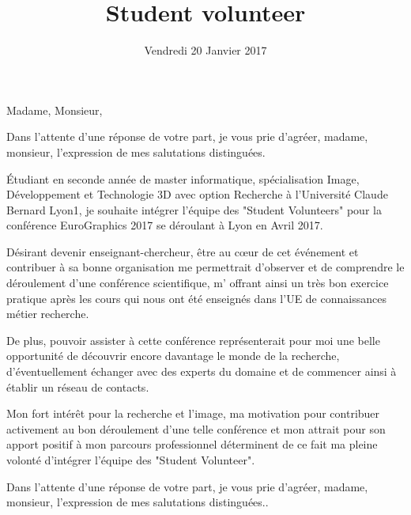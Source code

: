 \documentclass[12pt,a4paper,sans]{moderncv}        %
\title{\Large Student volunteer}                               %
\begin{document}
\date{Vendredi 20 Janvier 2017}
\opening{Madame, Monsieur,}
\closing{Dans l'attente d'une réponse de votre part, je vous prie d'agréer, madame, monsieur, l'expression de mes salutations distinguées.}
\makelettertitle

\justify
\'Etudiant en seconde année de master informatique, spécialisation Image, Développement et Technologie 3D avec option Recherche à l’Université Claude Bernard Lyon1, je souhaite intégrer l’équipe des "Student Volunteers" pour la conférence EuroGraphics 2017 se déroulant à Lyon en Avril 2017.

Désirant devenir enseignant-chercheur, être au cœur de cet événement et contribuer à sa bonne organisation me permettrait d’observer et de comprendre le déroulement d’une conférence scientifique, m' offrant ainsi un très bon exercice pratique après les cours qui nous ont été enseignés dans l’UE de connaissances métier recherche.

De plus, pouvoir assister à cette conférence représenterait pour moi une belle opportunité de découvrir encore davantage le monde de la recherche, d'éventuellement échanger avec des experts du domaine et de commencer ainsi à établir un réseau de contacts.

Mon fort intérêt pour la recherche et l’image, ma motivation pour contribuer activement au bon déroulement d'une telle conférence et mon attrait pour son apport positif à mon parcours professionnel déterminent de ce fait ma pleine volonté d'intégrer l'équipe des "Student Volunteer".

Dans l’attente d’une réponse de votre part, je vous prie d’agréer, madame, monsieur,
l’expression de mes salutations distinguées..
\vspace{0.3cm}

\makeletterclosing
\end{document}
